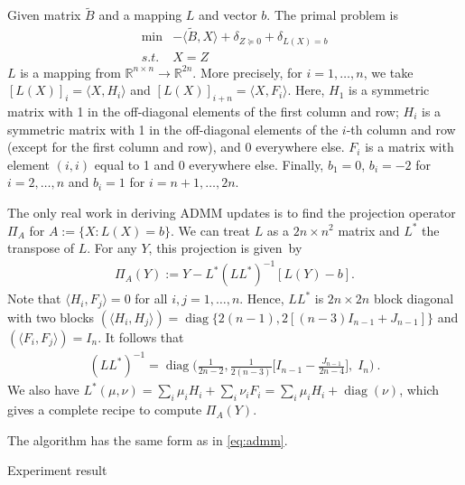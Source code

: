 \documentclass{ctexart}
\DeclareMathOperator{\diag}{diag}
\begin{document}
Given matrix $\widetilde{B}$ and a mapping $L$ and vector $b$. The primal
problem is
\begin{align*}
\min & - \langle \widetilde{B}, X\rangle + \delta_{Z \succeq 0} + \delta_{L(X) = b}\\
s.t.& X=Z
\end{align*}
$L$ is a mapping from $\mathbb{R}^{n \times n} \to \mathbb{R}^{2n}$.
More precisely, for $i=1,\dots,n$, we  take
$[L(X)]_i = \langle X,H_i \rangle$ and $[L(X)]_{i+n} = \langle X,F_i \rangle$. Here,
$H_1$ is a symmetric matrix with 1 in the off-diagonal elements of the first column and row;
$H_i$ is a symmetric matrix with 1 in the off-diagonal elements of the
$i$-th column and row (except for the first column and row), and 0 everywhere else.  $F_i$ is a matrix with
element $(i,i)$ equal to 1 and 0 everywhere else. 
Finally, $b_1=0$, $b_i = -2$ for $i=2,\dots,n$ and $b_i = 1$ for $i=n+1, \dots, 2n$. 

The only real work in deriving ADMM updates is to find the projection operator $\Pi_{A}$ for $ A := \{X: L(X) = b\}$.
We can treat $L$ as a $2n \times n^2$ matrix and $L^*$ the transpose of $L$. 
For any $Y$, this projection is given~by 
\begin{align}\label{eq:proj:L:Y}
\Pi_{A}(Y) := Y - L^* (L L^*)^{-1}[ L(Y) - b] .
\end{align}
Note that $\langle H_i,F_j \rangle = 0$
for all $i,j = 1, \dots, n$.
Hence, $L L^*$ is $2n\times 2n$ block diagonal with two blocks $(\langle H_i,H_j \rangle) =\diag\{2(n-1), 2[(n-3)I_{n-1}+J_{n-1}]\} $ and 
$(\langle F_i,F_j \rangle) = I_n$. It follows that
\begin{align*}
(LL^*)^{-1} = \diag\Big(\frac{1}{2n-2},\frac{1}{2(n-3)} 
\big[ I_{n-1} - \frac{J_{n-1}}{2n-4} \big],\; I_n \Big) \ . 
\end{align*}
We also have $L^*(\mu,\nu) = \sum_i \mu_i H_i + \sum_i \nu_i F_i =
\sum_i \mu_i H_i + \diag(\nu)$, which gives a complete
recipe to compute $\Pi_{A}(Y)$.

The algorithm has the same form as in \eqref{eq:admm}.

Experiment result
\end{document}
